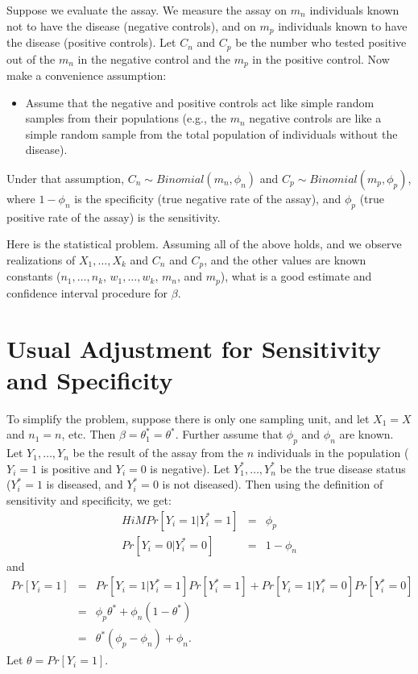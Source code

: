 \documentclass{article}
\begin{document}
Suppose we evaluate the assay. We measure the assay on $m_n$ individuals known not to have the disease (negative controls), and on $m_p$ individuals known to have the disease (positive controls). Let $C_n$ and $C_p$ be the number who tested positive out of the $m_n$ in the negative control and the $m_p$  in the positive control. Now make a convenience assumption:
\begin{itemize}
\item Assume that the negative and positive controls act like simple random samples from their populations (e.g., the $m_n$ negative controls are like a simple random sample from the total population of individuals without the disease).
\end{itemize}
Under that assumption, $C_n \sim Binomial(m_n, \phi_n)$ and $C_p \sim Binomial(m_p, \phi_p)$,
where $1-\phi_n$ is the specificity (true negative rate of the assay),
and $\phi_p$ (true positive rate of the assay) is the sensitivity.

Here is the statistical problem. Assuming all of the above holds, and we observe realizations of $X_1,\ldots, X_k$ and $C_n$ and $C_p$, and the other values are known constants ($n_1,\ldots, n_k$, $w_1,\ldots, w_k$,  $m_n$, and $m_p$), what is a good estimate and confidence interval procedure for $\beta$.


\section{Usual Adjustment for Sensitivity and Specificity}
\label{sec-usualAdj}

To simplify the problem, suppose there is only one sampling unit, and let $X_1=X$ and $n_1=n$, etc. Then $\beta = \theta_1^*=\theta^*$.
Further assume that $\phi_p$ and $\phi_n$ are known. Let $Y_1,\ldots,Y_n$ be the result of the assay from the $n$ individuals in the population
($Y_i=1$ is positive and $Y_i=0$ is negative). Let $Y_1^*,\ldots,Y_n^*$ be the true disease status ($Y_i^*=1$ is diseased, and $Y_i^*=0$ is not diseased).
Then using the definition of sensitivity and specificity, we get:
\begin{eqnarray*}Hi M
Pr[ Y_i =1 | Y_i^*=1] & = & \phi_p \\
Pr[ Y_i=0 | Y_i^*=0] & = & 1- \phi_n
\end{eqnarray*}
and
\begin{eqnarray*}
Pr[ Y_i=1] & = & Pr[ Y_i =1 | Y_i^*=1]  Pr[Y_i^*=1] + Pr[ Y_i =1 | Y_i^*=0] Pr[ Y_i^*=0] \\
& = & \phi_p \theta^* + \phi_n (1-\theta^*)  \\
& = & \theta^* (\phi_p - \phi_n) + \phi_n.
\end{eqnarray*}
Let $\theta = Pr[ Y_i=1]$.
\end{document}
